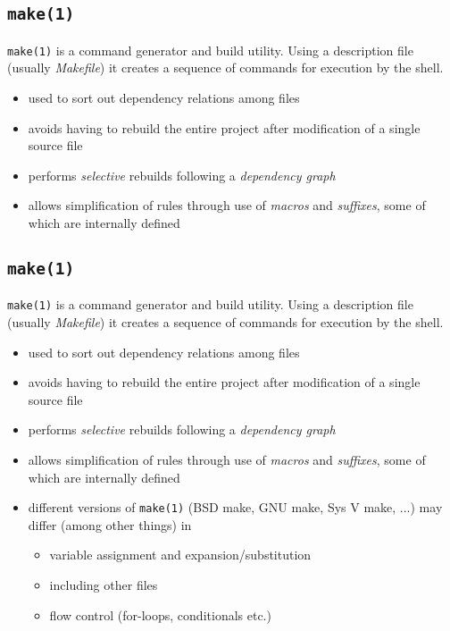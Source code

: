\documentclass[xga]{xdvislides}
\begin{document}
\subsection{{\tt make(1)}}
{\tt make(1)} is a command generator and build utility. Using a
description file (usually {\em Makefile}) it creates a sequence of
commands for execution by the shell.

\begin{itemize}
	\item used to sort out dependency relations among files
	\item avoids having to rebuild the entire project after modification of a
		single source file
	\item performs {\em selective} rebuilds following a {\em dependency graph}
	\item allows simplification of rules through use of {\em macros} and {\em
		suffixes}, some of which are internally defined
\end{itemize}

\subsection{{\tt make(1)}}
{\tt make(1)} is a command generator and build utility. Using a
description file (usually {\em Makefile}) it creates a sequence of
commands for execution by the shell.

\begin{itemize}
	\item used to sort out dependency relations among files
	\item avoids having to rebuild the entire project after modification of a
		single source file
	\item performs {\em selective} rebuilds following a {\em dependency graph}
	\item allows simplification of rules through use of {\em macros} and {\em
		suffixes}, some of which are internally defined
	\item different versions of {\tt make(1)} (BSD make, GNU make, Sys V make,
		...) may differ (among other things) in
		\begin{itemize}
			\item variable assignment and expansion/substitution
			\item including other files
			\item flow control (for-loops, conditionals etc.)
		\end{itemize}
\end{itemize}
\end{document}

